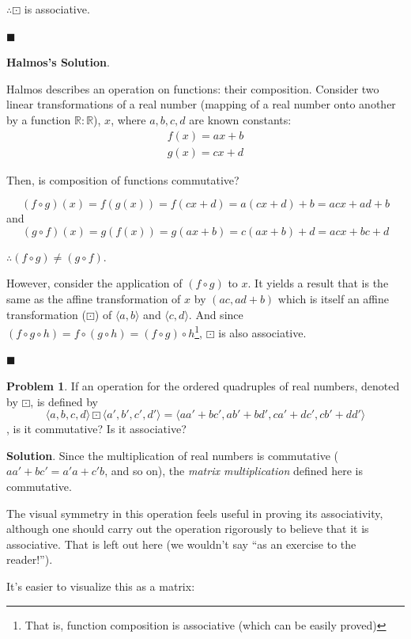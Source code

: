 \documentclass[english,notitlepage,smartquotes]{hgbreport}
\theoremstyle{definition}
\theoremstyle{definition}
\newtheorem{problem}{Problem}
\theoremstyle{remark}
\theoremstyle{definition}
\theoremstyle{plain}
\renewcommand\qedsymbol{$\blacksquare$}
\theoremstyle{definition}
\begin{document}
$\therefore \boxdot$ is associative.

\qedsymbol

\textbf{Halmos's Solution}.

Halmos describes an operation on functions: their composition. Consider two linear transformations of a real number (mapping of a real number onto another by a function $\mathbb {R}:\mathbb {R}$), $x$, where $a,b,c,d$ are known constants:
\begin{equation}
\begin{aligned}
f(x)=ax+b \\
g(x)=cx+d
\end{aligned}\label{eq:fg}
\end{equation}

Then, is composition of functions commutative? 

$$
(f\circ g)(x)=f(g(x))=f(cx+d)=a(cx+d)+b=acx+ad+b
$$
and
$$
(g\circ f)(x)=g(f(x))=g(ax+b)=c(ax+b)+d=acx+bc+d
$$

$\therefore (f\circ g)\ne(g\circ f)$.

However, consider the application of $(f\circ g)$ to $x$. It yields a result that is the same as the affine transformation of $x$ by $(ac, ad+b)$ which is itself an affine transformation ($\boxdot$) of $\langle a,b\rangle$ and $\langle c,d\rangle$. And since $(f\circ g\circ h)=f\circ(g\circ h)=(f\circ g)\circ h$\footnote{That is, function composition is associative (which can be easily proved)}, $\boxdot$ is also associative. 

\qedsymbol

\begin{problem}
\label{pr:matrixmult}
If an operation for the ordered quadruples of real numbers, denoted by $\boxdot$, is defined by
$$
\langle a,b,c,d\rangle\boxdot\langle a',b',c',d'\rangle=\langle aa'+bc',ab'+bd',ca'+dc',cb'+dd'\rangle
$$
, is it commutative? Is it associative?
\end{problem}

\textbf{Solution}.
Since the multiplication of real numbers is commutative ($aa'+bc'=a'a+c'b$, and so on), the \textit{matrix multiplication} defined here is commutative.

The visual symmetry in this operation feels useful in proving its associativity, although one should carry out the operation rigorously to believe that it is associative. That is left out here (we wouldn't say ``as an exercise to the reader!'').

It's easier to visualize this as a matrix:
\end{document}
